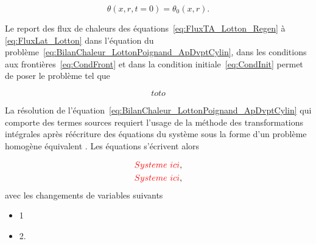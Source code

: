 \begin{equation}
	\theta(x,r,t=0) = \theta_0(x,r).
	\label{eq:CondInit}
\end{equation}

Le report des flux de chaleurs des équations~\eqref{eq:FluxTA_Lotton_Regen} à \eqref{eq:FluxLat_Lotton} dans l'équation du problème~\eqref{eq:BilanChaleur_LottonPoignand_ApDvptCylin}, dans les conditions aux frontières~\eqref{eq:CondFront} et dans la condition initiale~\eqref{eq:CondInit} permet de poser le problème tel que

\begin{equation}
	toto
	\label{eq:ProbTransitoire_ApDvpt}
\end{equation}

La résolution de l'équation~\eqref{eq:BilanChaleur_LottonPoignand_ApDvptCylin} qui comporte des termes sources requiert l'usage de la méthode des transformations intégrales après réécriture des équations du système sous la forme d'un problème homogène équivalent \cite{ozisik_integraltransform_heat_1993}. Les équations s'écrivent alors

\begin{subequations}
	\begin{align}
		\textcolor{red}{Systeme\ ici},\label{eq:1_LottonPoignand}\\
		\textcolor{red}{Systeme\ ici},\label{eq:2_LottonPoignand}
	\end{align}
	\label{eq:SystemeEq_LottonPoignand}
\end{subequations}
avec les changements de variables suivants

\begin{itemize} \color{red}
	\item 1
	\item 2.
\end{itemize}







